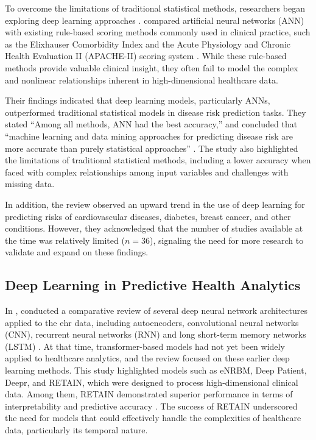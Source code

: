 To overcome the limitations of traditional statistical methods, researchers began exploring deep learning approaches \cite{emmert2020introductory,emmert2020artificial}. \citeauthor{UseElectronicHealth2021} compared artificial neural networks (ANN) with existing rule-based scoring methods commonly used in clinical practice, such as the Elixhauser Comorbidity Index and the Acute Physiology and Chronic Health Evaluation II (APACHE-II) scoring system \cite{UseElectronicHealth2021}. While these rule-based methods provide valuable clinical insight, they often fail to model the complex and nonlinear relationships inherent in high-dimensional healthcare data.

Their findings indicated that deep learning models, particularly ANNs, outperformed traditional statistical models in disease risk prediction tasks. They stated ``Among all methods, ANN had the best accuracy,'' and concluded that ``machine learning and data mining approaches for predicting disease risk are more accurate than purely statistical approaches'' \cite[][p.~751]{UseElectronicHealth2021}. The study also highlighted the limitations of traditional statistical methods, including a lower accuracy when faced with complex relationships among input variables and challenges with missing data.

In addition, the review observed an upward trend in the use of deep learning for predicting risks of cardiovascular diseases, diabetes, breast cancer, and other conditions. However, they acknowledged that the number of studies available at the time was relatively limited ($n=36$), signaling the need for more research to validate and expand on these findings.

\subsection*{Deep Learning in Predictive Health Analytics}

In \citeyear{DeepLearningElectronic2020}, \citeauthor{DeepLearningElectronic2020} conducted a comparative review of several deep neural network architectures applied to the \gls{ehr} data, including autoencoders, convolutional neural networks (CNN), recurrent neural networks (RNN) and long short-term memory networks (LSTM) \cite{DeepLearningElectronic2020}. At that time, transformer-based models had not yet been widely applied to healthcare analytics, and the review focused on these earlier deep learning methods. This study highlighted models such as eNRBM, Deep Patient, Deepr, and RETAIN, which were designed to process high-dimensional clinical data. Among them, RETAIN demonstrated superior performance in terms of interpretability and predictive accuracy \cite{RETAIN2017}. The success of RETAIN underscored the need for models that could effectively handle the complexities of healthcare data, particularly its temporal nature.

